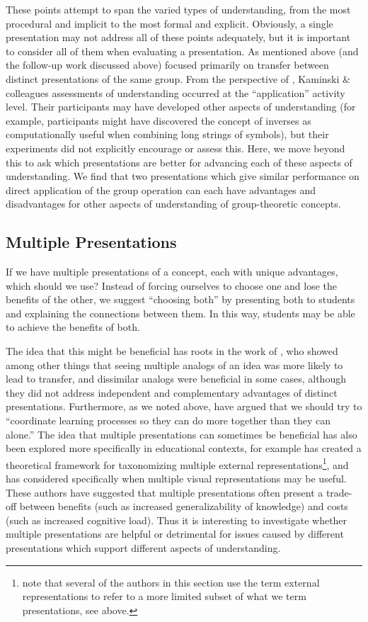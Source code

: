 \documentclass[man,10pt]{apa6}
\begin{document}
These points attempt to span the varied types of understanding, from the most procedural and implicit to the most formal and explicit. Obviously, a single presentation may not address all of these points adequately, but it is important to consider all of them when evaluating a presentation. As mentioned above  (and the follow-up work discussed above) focused primarily on transfer between distinct presentations of the same group. From the perspective of , Kaminski \& colleagues assessments of understanding occurred at the ``application'' activity level. Their participants may have developed other aspects of understanding (for example, participants might have discovered the concept of inverses as computationally useful when combining long strings of symbols), but their experiments did not explicitly encourage or assess this. Here, we move beyond this to ask which presentations are better for advancing each of these aspects of understanding. We find that two presentations which give similar performance on direct application of the group operation can each have advantages and disadvantages for other aspects of understanding of group-theoretic concepts.\par
\subsection{Multiple Presentations}
If we have multiple presentations of a concept, each with unique advantages, which should we use? Instead of forcing ourselves to choose one and lose the benefits of the other, we suggest ``choosing both'' \cite{Schwartz2015} by presenting both to students and explaining the connections between them. In this way, students may be able to achieve the benefits of both.\par
The idea that this might be beneficial has roots in the work of , who showed among other things that seeing multiple analogs of an idea was more likely to lead to transfer, and dissimilar analogs were beneficial in some cases, although they did not address independent and complementary advantages of distinct presentations. Furthermore, as we noted above,  have argued that we should try to ``coordinate learning processes so they can do more together than they can alone.'' The idea that multiple presentations can sometimes be beneficial has also been explored more specifically in educational contexts, for example  has created a theoretical framework for taxonomizing multiple external representations\footnote{note that several of the authors in this section use the term external representations to refer to a more limited subset of what we term presentations, see above.}, and  has considered specifically when multiple visual representations may be useful. These authors have suggested that multiple presentations often present a trade-off between benefits (such as increased generalizability of knowledge) and costs (such as increased cognitive load). Thus it is interesting to investigate whether multiple presentations are helpful or detrimental for issues caused by different presentations which support different aspects of understanding. 
\end{document}
